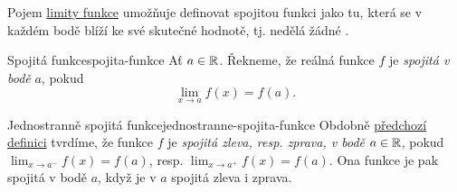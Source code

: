 Pojem \hyperref[def:oboustranna-limita-funkce]{limity funkce} umožňuje definovat
spojitou funkci jako tu, která se v každém bodě blíží ke své skutečné hodnotě,
tj. nedělá žádné .

\begin{definition}{Spojitá funkce}{spojita-funkce}
 Ať $a \in \mathbb{R}$. Řekneme, že reálná funkce $f$ je \emph{spojitá v bodě} $a$,
 pokud
 \[
  \lim_{x \to a} f(x) = f(a).
 \]
\end{definition}

\begin{remark}{Jednostranně spojitá funkce}{jednostranne-spojita-funkce}
 Obdobně \hyperref[def:spojita-funkce]{předchozí definici} tvrdíme, že funkce
 $f$ je \emph{spojitá zleva, resp. zprava, v bodě} $a \in \mathbb{R}$, pokud $\lim_{x
 \to a^{-}} f(x) = f(a)$, resp. $\lim_{x \to a^{+}} f(x) = f(a)$. Ona funkce je
 pak spojitá v bodě $a$, když je v $a$ spojitá zleva i zprava.
\end{remark}

